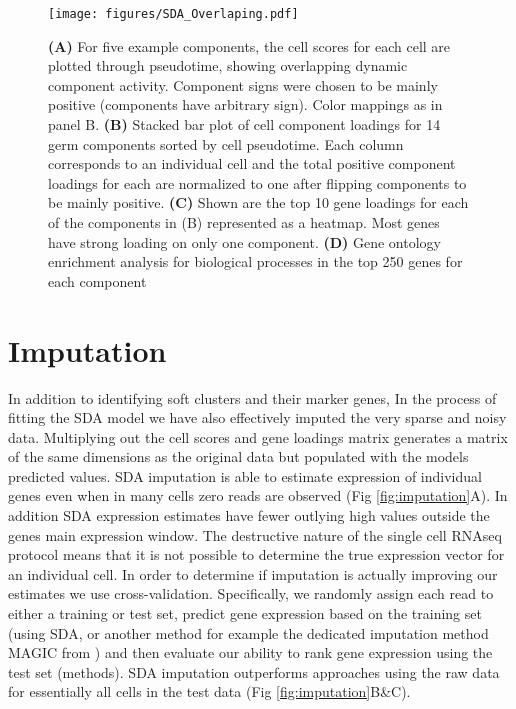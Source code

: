 \begin{figure}[H]
	\centering
	\texttt{[image: figures/SDA\_Overlaping.pdf]}
	\caption{
		\textbf{(A)} For five example components, the cell scores for each cell are plotted through pseudotime, showing overlapping dynamic component activity. Component signs were chosen to be mainly positive (components have arbitrary sign). Color mappings as in panel B.
		\textbf{(B)} Stacked bar plot of cell component loadings for 14 germ components sorted by cell pseudotime. Each column corresponds to an individual cell and the total positive component loadings for each are normalized to one after flipping components to be mainly positive.
		\textbf{(C)} Shown are the top 10 gene loadings for each of the components in (B) represented as a heatmap. Most genes have strong loading on only one component.
		\textbf{(D)} Gene ontology enrichment analysis for biological processes in the top 250 genes for each component }
	\label{fig:SDA_overlapping}
\end{figure}



\section{Imputation}

In addition to identifying soft clusters and their marker genes, In the process of fitting the SDA model we have also effectively imputed the very sparse and noisy data. Multiplying out the cell scores and gene loadings matrix generates a matrix of the same dimensions as the original data but populated with the models predicted values. SDA imputation is able to estimate expression of individual genes even when in many cells zero reads are observed (Fig \ref{fig:imputation}A). In addition SDA expression estimates have fewer outlying high values outside the genes main expression window. The destructive nature of the single cell RNAseq protocol means that it is not possible to determine the true expression vector for an individual cell. In order to determine if imputation is actually improving our estimates we use cross-validation. Specifically, we randomly assign each read to either a training or test set, predict gene expression based on the training set (using SDA, or another method for example the dedicated imputation method MAGIC from \cite{vanDijk2018Recovering}) and then evaluate our ability to rank gene expression using the test set (methods). SDA imputation outperforms approaches using the raw data for essentially all cells in the test data (Fig \ref{fig:imputation}B\&C).

